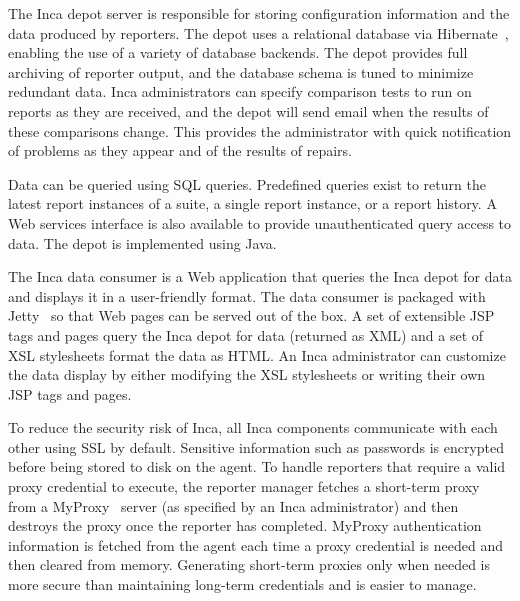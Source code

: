 \documentclass[times,10pt,twocolumn]{article}
\begin{document}

The Inca depot server is responsible for storing configuration information and
the data produced by reporters. The depot uses a relational database via
Hibernate~\cite{hibernate}, enabling the use of a variety of database backends.
The depot provides full archiving of reporter output, and the database schema is
tuned to minimize redundant data.  Inca administrators can specify comparison
tests to run on reports as they are received, and the depot will send email
when the results of these comparisons change.  This provides the administrator
with quick notification of problems as they appear and of the results of
repairs.

Data can be queried using SQL queries. Predefined queries exist to return the
latest report instances of a suite, a single report instance, or a report
history.  A Web services interface is also available to provide
unauthenticated query access to data.  The depot is implemented using Java.


The Inca data consumer is a Web application that queries the Inca depot for
data and displays it in a user-friendly format.  The data consumer is packaged
with Jetty~\cite{jetty} so that Web pages can be served out of the box.  A set
of extensible JSP tags and pages query the Inca depot for data (returned as
XML)
and a set of XSL stylesheets format the data as HTML.  An Inca administrator
can customize the data display by either modifying the XSL stylesheets or
writing their own JSP tags and pages.

\label{security}

To reduce the security risk of Inca, all Inca components communicate with each
other using SSL by default.  Sensitive information such as passwords is
encrypted before being stored to disk on the agent.  To handle reporters that
require a valid proxy credential to execute, the reporter manager fetches a
short-term proxy from a MyProxy~\cite{myproxy} server (as specified by an Inca
administrator) and then destroys the proxy once the reporter has completed.
MyProxy authentication information is fetched from the agent each time a proxy
credential is needed and then cleared from memory.  Generating short-term 
proxies only when needed is more secure than maintaining long-term
credentials and is easier to manage.

\end{document}
